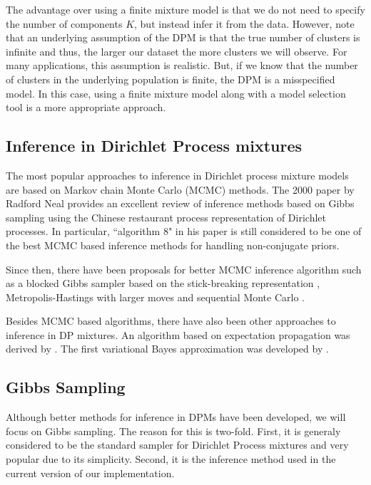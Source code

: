 \documentclass[final,3p,times,twocolumn]{elsarticle}
\begin{document}
The advantage over using a finite mixture model is that we do not need to specify the number of components $K$, but instead infer it from the data.
However, note that an underlying assumption of the DPM is that the true number of clusters is infinite and thus, the larger our dataset the more clusters we will observe.
For many applications, this assumption is realistic.
But, if we know that the number of clusters in the underlying population is finite, the DPM is a misspecified model. In this case, using a finite mixture model along with a model selection tool is a more appropriate approach.

\subsection{Inference in Dirichlet Process mixtures}
The most popular approaches to inference in Dirichlet process mixture models are based on Markov chain Monte Carlo (MCMC) methods.
The 2000 paper by Radford Neal \cite{neal2000} provides an excellent review of inference methods based on Gibbs sampling using the Chinese restaurant process representation of Dirichlet processes.
In particular, ``algorithm 8" in his paper is still considered to be one of the best MCMC based inference methods for handling non-conjugate priors.

Since then, there have been proposals for better MCMC inference algorithm such as a blocked Gibbs sampler based on the stick-breaking representation \cite{ishwaran2001}, Metropolis-Hastings with larger moves \cite{jain2004} and sequential Monte Carlo \cite{fearnhead2004}.

Besides MCMC based algorithms, there have also been other approaches to inference in DP mixtures.
An algorithm based on expectation propagation was derived by \cite{minka2003}.
The first variational Bayes approximation was developed by \cite{blei2006}.

\subsection{Gibbs Sampling}
Although better methods for inference in DPMs have been developed, we will focus on Gibbs sampling.
The reason for this is two-fold.
First, it is generaly considered to be the standard sampler for Dirichlet Process mixtures and very popular due to its simplicity.
Second, it is the inference method used in the current version of our implementation.
\end{document}
